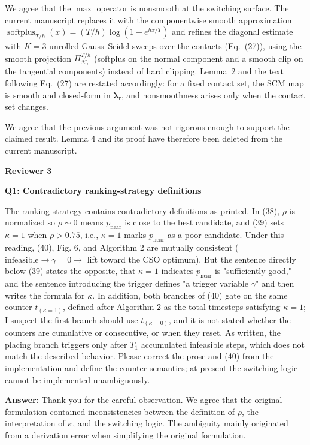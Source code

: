 \documentclass[journal,10pt]{IEEEtran}
\newcommand{\reviewer}[1]{\par\smallskip\noindent
 \textcolor{responseblue}{\textbf{#1\hspace{0.2em}}}}
\newcommand{\question}[2]{\par\smallskip\noindent
 \color{responseblue}\textbf{Q#1: #2}\par\nobreak\noindent\color{responseblue}}
\newcommand{\answer}{\par\smallskip\noindent\color{black}\textbf{Answer: }\ignorespaces
}
\begin{document}
 We agree that the $\max$ operator is nonsmooth at the switching surface. The current manuscript replaces it with the componentwise smooth approximation $\operatorname{softplus}_{T/h}(x)=(T/h)\log(1+e^{hx/T})$ and refines the diagonal estimate with $K=3$ unrolled Gauss--Seidel sweeps over the contacts (Eq.~(27)), using the smooth projection $\Pi^{T/h}_{\mathcal{K}_i}$ (softplus on the normal component and a smooth clip on the tangential components) instead of hard clipping. Lemma~2 and the text following Eq.~(27) are restated accordingly: for a fixed contact set, the SCM map is smooth and closed-form in $\boldsymbol{\lambda}_{\mathrm{r}}$, and nonsmoothness arises only when the contact set changes.

We agree that the previous argument was not rigorous enough to support the claimed result. Lemma 4 and its proof have therefore been deleted from the current manuscript.

\reviewer{Reviewer 3}

\question{1}{Contradictory ranking-strategy definitions}

The ranking strategy contains contradictory definitions as printed. In
(38), $\rho$ is normalized so $\rho \sim 0$ means $p_{\mathrm{near}}$ is close to the best
candidate, and (39) sets $\kappa = 1$ when $\rho > 0.75$, i.e., $\kappa = 1$
marks $p_{\mathrm{near}}$ as a poor candidate. Under this reading, (40), Fig. 6, and
Algorithm 2 are mutually consistent ($\mathrm{infeasible} \rightarrow \gamma = 0 \rightarrow$ lift
toward the CSO optimum). But the sentence directly below (39) states
the opposite, that $\kappa = 1$ indicates $p_{\mathrm{near}}$ is "sufficiently good,"
and the sentence introducing the trigger defines "a trigger variable
$\gamma$" and then writes the formula for $\kappa$. In addition, both
branches of (40) gate on the same counter $t_{(\kappa=1)}$, defined after
Algorithm 2 as the total timesteps satisfying $\kappa = 1$; I suspect
the first branch should use $t_{(\kappa=0)}$, and it is not stated whether
the counters are cumulative or consecutive, or when they reset. As written,
the placing branch triggers only after $T_1$ accumulated infeasible steps,
which does not match the described behavior. Please correct the prose
and (40) from the implementation and define the counter semantics; at
present the switching logic cannot be implemented unambiguously.

\answer Thank you for the careful observation. We agree that the original formulation contained inconsistencies between the definition of $\rho$, the interpretation of $\kappa$, and the switching logic. The ambiguity mainly originated from a derivation error when simplifying the original formulation.
\end{document}
